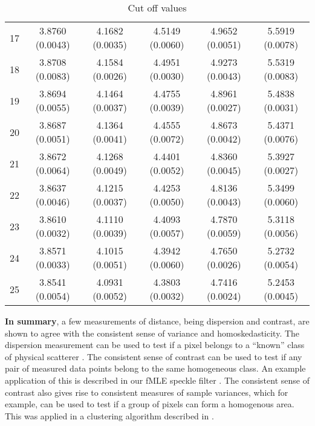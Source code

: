 \begin{table}
\begin{tabular}{c|c|c|c|c|c}
17  &3.8760 (0.0043)  &4.1682 (0.0035)  &4.5149 (0.0060)  &4.9652 (0.0051)  &5.5919 (0.0078)\\
18  &3.8708 (0.0083)  &4.1584 (0.0026)  &4.4951 (0.0030)  &4.9273 (0.0043)  &5.5319 (0.0083)\\
19  &3.8694 (0.0055)  &4.1464 (0.0037)  &4.4755 (0.0039)  &4.8961 (0.0027)  &5.4838 (0.0031)\\
20  &3.8687 (0.0051)  &4.1364 (0.0041)  &4.4555 (0.0072)  &4.8673 (0.0042)  &5.4371 (0.0076)\\
21  &3.8672 (0.0064)  &4.1268 (0.0049)  &4.4401 (0.0052)  &4.8360 (0.0045)  &5.3927 (0.0027)\\
22  &3.8637 (0.0046)  &4.1215 (0.0037)  &4.4253 (0.0050)  &4.8136 (0.0043)  &5.3499 (0.0060)\\
23  &3.8610 (0.0032)  &4.1110 (0.0039)  &4.4093 (0.0057)  &4.7870 (0.0059)  &5.3118 (0.0056)\\
24  &3.8571 (0.0033)  &4.1015 (0.0051)  &4.3942 (0.0060)  &4.7650 (0.0026)  &5.2732 (0.0054)\\
25  &3.8541 (0.0054)  &4.0931 (0.0052)  &4.3803 (0.0032)  &4.7416 (0.0024)  &5.2453 (0.0045)
\end{tabular}

\caption{Cut off values}
\label{tab:var_cut_off_values}
\end{table}



\textbf{In summary}, a few measurements of distance, being dispersion and contrast, are shown to agree with the consistent sense of variance and homoskedasticity.
The dispersion measurement can be used to test 
if a pixel belongs to a ``known'' class of physical scatterer \cite{Le_2010_ACRS}.
The consistent sense of contrast can be used to test if any pair of measured data points belong to  the same homogeneous class.
An example application of this is described in our fMLE speckle filter \cite{Le_2011_ACRS}.
The consistent sense 
of contrast also gives rise to consistent measures of sample variances, which for example, can be used to test 
if a group of pixels can form a homogenous area.
This was applied in a clustering algorithm described in  \cite{Le_2010_ACRS}.

